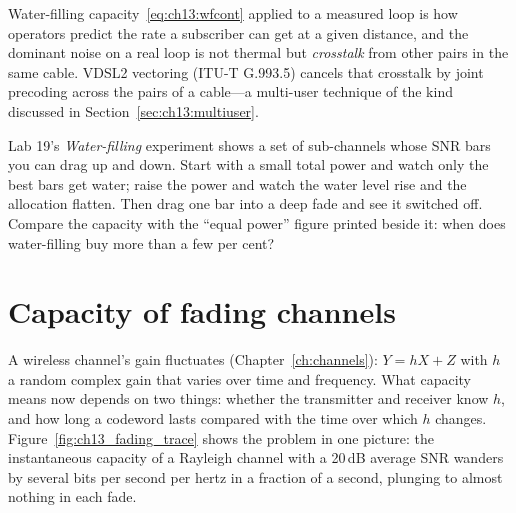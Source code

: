 \begin{inpractice}
Water-filling capacity~\eqref{eq:ch13:wfcont} applied to a measured loop is how operators predict
the rate a subscriber can get at a given distance, and the dominant noise on a real loop is not
thermal but \emph{crosstalk} from other pairs in the same cable. VDSL2 vectoring (ITU-T G.993.5)
cancels that crosstalk by joint precoding across the pairs of a cable---a multi-user technique of
the kind discussed in Section~\ref{sec:ch13:multiuser}.
\end{inpractice}

\begin{tryit}
Lab 19's \emph{Water-filling} experiment shows a set of sub-channels whose SNR bars you can drag
up and down. Start with a small total power and watch only the best bars get water; raise the
power and watch the water level rise and the allocation flatten. Then drag one bar into a deep
fade and see it switched off. Compare the capacity with the ``equal power'' figure printed beside
it: when does water-filling buy more than a few per cent?
\end{tryit}

\section{Capacity of fading channels}
\label{sec:ch13:fading}

A wireless channel's gain fluctuates (Chapter~\ref{ch:channels}): $Y=hX+Z$ with $h$ a random
complex gain that varies over time and frequency. What capacity means now depends on two things:
whether the transmitter and receiver know $h$, and how long a codeword lasts compared with the
time over which $h$ changes. Figure~\ref{fig:ch13_fading_trace} shows the problem in one picture:
the instantaneous capacity of a Rayleigh channel with a 20\,dB average SNR wanders by several
bits per second per hertz in a fraction of a second, plunging to almost nothing in each fade.


